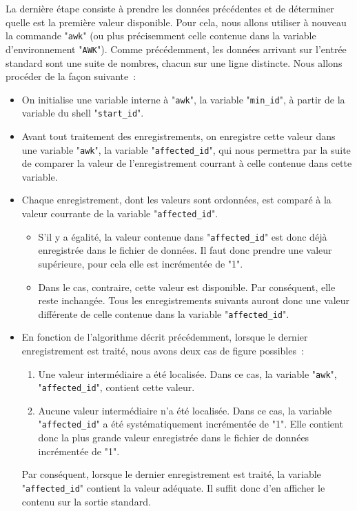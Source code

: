 La derni{\`e}re {\'e}tape consiste {\`a} prendre les donn{\'e}es pr{\'e}c{\'e}dentes et de d{\'e}terminer
quelle est la premi{\`e}re valeur disponible. Pour cela, nous allons utiliser {\`a} nouveau
la commande "{\tt awk}" (ou plus pr{\'e}cisemment celle contenue dans la variable
d'environnement "{\tt AWK}"). Comme pr{\'e}c{\'e}demment, les donn{\'e}es arrivant
sur l'entr{\'e}e standard sont une suite de nombres, chacun sur une ligne distincte.
Nous allons proc{\'e}der de la fa\c{c}on suivante~:
\begin{itemize}
	\item	On initialise une variable interne {\`a} "{\tt awk}", la variable
			"{\tt min\_id}", {\`a} partir de la variable du shell
			"{\tt start\_id}".
	\item	Avant tout traitement des enregistrements, on enregistre cette
			valeur dans une variable "{\tt awk}", la variable
			"{\tt affected\_id}", qui nous permettra par la suite de comparer
			la valeur de l'enregistrement courrant {\`a} celle contenue dans cette
			variable.
	\item	Chaque enregistrement, dont les valeurs sont ordonn{\'e}es, est compar{\'e}
			{\`a} la valeur courrante de la variable "{\tt affected\_id}".
			\begin{itemize}
				\item	S'il y a {\'e}galit{\'e}, la valeur contenue dans
						"{\tt affected\_id}" est donc
						d{\'e}j{\`a} enregistr{\'e}e dans le fichier de donn{\'e}es.
						Il faut donc prendre une valeur sup{\'e}rieure, pour cela elle
						est incr{\'e}ment{\'e}e de "1".
				\item	Dans le cas, contraire, cette valeur est disponible. Par
						cons{\'e}quent, elle reste inchang{\'e}e. Tous les enregistrements
						suivants auront donc une valeur diff{\'e}rente de celle contenue
						dans la variable "{\tt affected\_id}".
			\end{itemize}
	\item	En fonction de l'algorithme d{\'e}crit pr{\'e}c{\'e}demment, lorsque le dernier
			enregistrement est trait{\'e}, nous avons deux cas de figure possibles~:
			\begin{enumerate}
				\item	Une valeur interm{\'e}diaire a {\'e}t{\'e} localis{\'e}e. Dans ce cas,
						la variable "{\tt awk}", "{\tt affected\_id}",
						contient cette valeur.
				\item	Aucune valeur interm{\'e}diaire n'a {\'e}t{\'e} localis{\'e}e. Dans ce
						cas, la variable "{\tt affected\_id}" a {\'e}t{\'e}
						syst{\'e}matiquement incr{\'e}ment{\'e}e de "1". Elle contient
						donc la plus grande valeur enregistr{\'e}e dans le fichier
						de donn{\'e}es incr{\'e}ment{\'e}e de "1".
			\end{enumerate}
			Par cons{\'e}quent, lorsque le dernier enregistrement est trait{\'e}, la 
			variable "{\tt affected\_id}" contient la valeur ad{\'e}quate. Il suffit
			donc d'en afficher le contenu sur la sortie standard.
\end{itemize}
